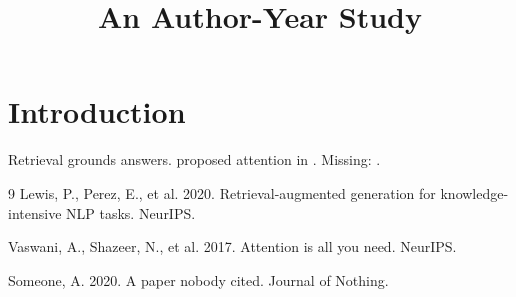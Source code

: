 \documentclass{article}
\title{An Author-Year Study}
\begin{document}
\section{Introduction}
Retrieval \citep{lewis2020} grounds answers.
\citeauthor{vaswani2017} proposed attention in \citeyear{vaswani2017}.
Missing: \citep{ghost2021}.

\begin{thebibliography}{9}
Lewis, P., Perez, E., et al. 2020. Retrieval-augmented generation
for knowledge-intensive NLP tasks. NeurIPS.

Vaswani, A., Shazeer, N., et al. 2017. Attention is all you need.
NeurIPS.

Someone, A. 2020. A paper nobody cited. Journal of Nothing.
\end{thebibliography}
\end{document}
